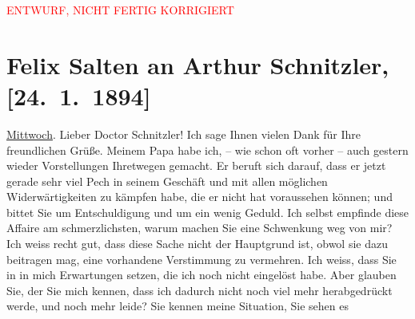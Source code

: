 
\begin{center}
            \textcolor{red}{ENTWURF, NICHT FERTIG KORRIGIERT}
                      \end{center}
            
         
         \renewcommand{\erwaehntePersonen}{Personen: Philipp Salzmann}
         \renewcommand{\erwaehnteOrte}{Orte: Wien}
         \renewcommand{\erwaehnteWerke}{}
               \section[Felix Salten an Arthur Schnitzler, {[}24. 1. 1894{]}]{ Felix Salten an Arthur Schnitzler, {[}24. 1. 1894{]}}\nopagebreak{}\rehead{ }\begin{ledgroupsized}[t]{13cm}\normalsize\beginnumbering \toendnotes[C]{\smallbreak\pagebreak[2]} 
\toendnotes[C]{\smallbreak}\pstart
           {\pb}\uline{Mittwoch}.\pend
           \pstart
           Lieber Doctor Schnitzler! Ich sage Ihnen vielen Dank für Ihre
               freundlichen Grüße. Meinem Papa habe ich, – wie schon oft vorher – auch gestern wieder Vorstellungen
               Ihretwegen gemacht. Er beruft sich darauf, dass er jetzt gerade sehr viel Pech in
               seinem Geschäft und mit allen möglichen Widerwärtigkeiten zu kämpfen habe, die er
               nicht hat voraussehen können; und bittet Sie um Entschuldigung und um ein wenig
               Geduld. Ich selbst {\pb}empfinde diese Affaire am schmerzlichsten, warum machen Sie eine Schwenkung weg von
               mir? Ich weiss recht gut, dass diese Sache nicht der Hauptgrund ist, obwol sie dazu
               beitragen mag, eine vorhandene Verstimmung zu vermehren. Ich weiss, dass Sie in
               \label{K_L03132-1v}\label{K_L03132-1h} in mich Erwartungen setzen, die ich noch nicht eingelöst
               habe. Aber glauben Sie, der Sie mich kennen, dass ich dadurch nicht noch viel mehr
               herabgedrückt werde, und noch mehr leide? Sie kennen meine Situation, Sie sehen es

\end{ledgroupsized}
